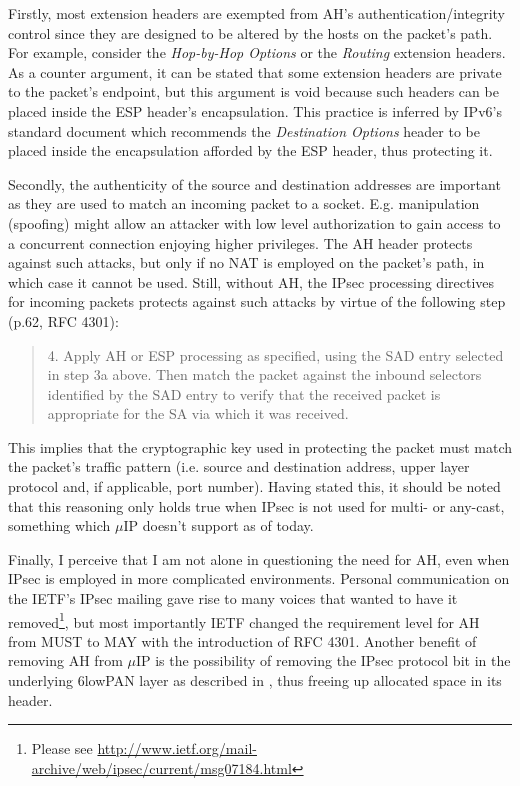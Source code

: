 \documentclass[final,a4paper,twoside,11pt,onecolumn]{report}
\begin{document}
Firstly, most extension headers are exempted from AH's authentication/integrity control since they are designed to be altered by the hosts on the packet's path. For example, consider the \emph{Hop-by-Hop Options} or the \emph{Routing} extension headers. As a counter argument, it can be stated that some extension headers are private to the packet's endpoint, but this argument is void because such headers can be placed inside the ESP header's encapsulation. This practice is inferred by IPv6's standard document\citep[p.13]{rfc2460} which recommends the \emph{Destination Options} header to be placed inside the encapsulation afforded by the ESP header, thus protecting it.

Secondly, the authenticity of the source and destination addresses are important as they are used to match an incoming packet to a socket. E.g. manipulation (spoofing) might allow an attacker with low level authorization to gain access to a concurrent connection enjoying higher privileges. The AH header protects against such attacks, but only if no NAT is employed on the packet's path, in which case it cannot be used. Still, without AH, the IPsec processing directives for incoming packets protects against such attacks by virtue of the following step (p.62, RFC 4301):


\begin{quotation}
4.  Apply AH or ESP processing as specified, using the SAD entry
    selected in step 3a above. Then match the packet against the
    inbound selectors identified by the SAD entry to verify that the
    received packet is appropriate for the SA via which it was
    received.
\end{quotation}

This implies that the cryptographic key used in protecting the packet must match the packet's traffic pattern (i.e. source and destination address, upper layer protocol and, if applicable, port number). Having stated this, it should be noted that this reasoning only holds true when IPsec is not used for multi- or any-cast, something which $\mu$IP doesn't support as of today.

Finally, I perceive that I am not alone in questioning the need for AH, even when IPsec is employed in more complicated environments. Personal communication on the IETF's IPsec mailing gave rise to many voices that wanted to have it removed\footnote{Please see \url{http://www.ietf.org/mail-archive/web/ipsec/current/msg07184.html}}, but most importantly IETF changed the requirement level for AH from MUST to MAY with the introduction of RFC 4301. Another benefit of removing AH from $\mu$IP is the possibility of removing the IPsec protocol bit in the underlying 6lowPAN layer as described in \cite{raza11securing}, thus freeing up allocated space in its header.
\end{document}
